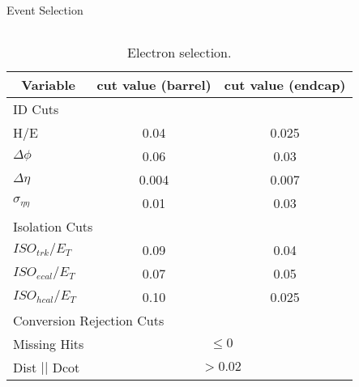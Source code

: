 \documentclass[t, 8pt]{beamer}
\begin{document}
\begin{frame}{Event Selection}
\begin{columns}[c]
\tiny{
    \begin{center}
    \begin{table}[htbp]
    \begin{tabular}{|lcc|} \hline
      \multicolumn{1}{|c}{Variable} & \multicolumn{1}{c}{cut value (barrel)}& \multicolumn{1}{c|}{cut value (endcap)}\\
        \hline   \hline
       \multicolumn{3}{|l|}{ID Cuts}\\ \hline
        H/E & 0.04 & 0.025 \\
        $\Delta\phi$ & 0.06 & 0.03 \\
        $\Delta\eta$ & 0.004 & 0.007  \\
        $\sigma_{\eta\eta}$ & 0.01 & 0.03 \\ \hline
      \multicolumn{3}{|l|}{Isolation Cuts}\\ \hline
       $ISO_{trk} / E_T $  & 0.09 & 0.04 \\
       $ISO_{ecal}/ E_T$  & 0.07 & 0.05 \\
       $ISO_{hcal}/ E_T$  & 0.10 & 0.025 \\ \hline
      \multicolumn{3}{|l|}{Conversion Rejection Cuts}\\ \hline
       Missing Hits  & \multicolumn{2}{c|}{$\leq 0$}\\
       Dist $||$ Dcot   & \multicolumn{2}{c|}{$>0.02$}\\
      \hline
    \end{tabular}
    \caption{\label{tab:elecuts} Electron selection.}%
    \end{table}
    \end{center}
}
  \end{columns}
\end{frame}
\end{document}
